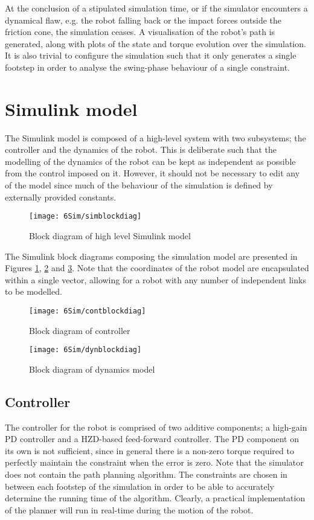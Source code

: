 At the conclusion of a stipulated simulation time, or if the simulator encounters a dynamical flaw, e.g. the robot falling back or the impact forces outside the friction cone, the simulation ceases. A visualisation of the robot's path is generated, along with plots of the state and torque evolution over the simulation. It is also trivial to configure the simulation such that it only generates a single footstep in order to analyse the swing-phase behaviour of a single constraint.

\section{Simulink model}
The Simulink model is composed of a high-level system with two subsystems; the controller and the dynamics of the robot. This is deliberate such that the modelling of the dynamics of the robot can be kept as independent as possible from the control imposed on it. However, it should not be necessary to edit any of the model since much of the behaviour of the simulation is defined by externally provided constants.

\begin{figure}
	\centering
	\texttt{[image: 6Sim/simblockdiag]}
	\caption{Block diagram of high level Simulink model}
	\label{fig:simblockdiag}
\end{figure}

The Simulink block diagrams composing the simulation model are presented in Figures \ref{fig:simblockdiag}, \ref{fig:contblockdiag} and \ref{fig:dynblockdiag}. Note that the coordinates of the robot model are encapsulated within a single vector, allowing for a robot with any number of independent links to be modelled.

\begin{figure}
	\centering
	\texttt{[image: 6Sim/contblockdiag]}
	\caption{Block diagram of controller}
	\label{fig:contblockdiag}
\end{figure}

\begin{figure}
	\centering
	\texttt{[image: 6Sim/dynblockdiag]}
	\caption{Block diagram of dynamics model}
	\label{fig:dynblockdiag}
\end{figure}

\subsection{Controller}
The controller for the robot is comprised of two additive components; a high-gain PD controller and a HZD-based feed-forward controller. The PD component on its own is not sufficient, since in general there is a non-zero torque required to perfectly maintain the constraint when the error is zero. Note that the simulator does not contain the path planning algorithm. The constraints are chosen in between each footstep of the simulation in order to be able to accurately determine the running time of the algorithm. Clearly, a practical implementation of the planner will run in real-time during the motion of the robot.

